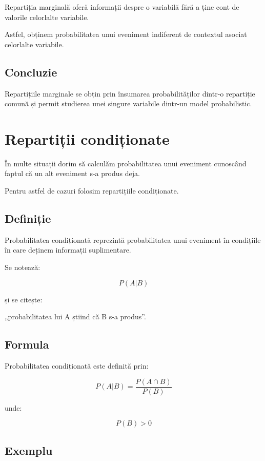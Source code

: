 \documentclass[12pt,a4paper]{article}
\begin{document}
Repartiția marginală oferă informații despre o variabilă fără a ține cont de valorile celorlalte variabile.

Astfel, obținem probabilitatea unui eveniment indiferent de contextul asociat celorlalte variabile.

\subsection{Concluzie}

Repartițiile marginale se obțin prin însumarea probabilităților dintr-o repartiție comună și permit studierea unei singure variabile dintr-un model probabilistic.








\section{Repartiții condiționate}

În multe situații dorim să calculăm probabilitatea unui eveniment cunoscând faptul că un alt eveniment s-a produs deja.

Pentru astfel de cazuri folosim repartițiile condiționate.

\subsection{Definiție}

Probabilitatea condiționată reprezintă probabilitatea unui eveniment în condițiile în care deținem informații suplimentare.

Se notează:

\[
P(A|B)
\]

și se citește:

„probabilitatea lui A știind că B s-a produs”.

\subsection{Formula}

Probabilitatea condiționată este definită prin:

\[
P(A|B)
=
\frac{P(A \cap B)}
     {P(B)}
\]

unde:

\[
P(B) > 0
\]

\subsection{Exemplu}
\end{document}
